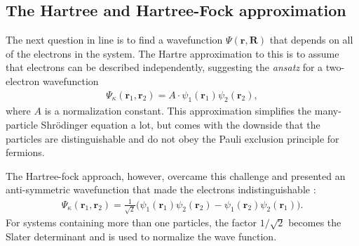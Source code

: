 \subsection{The Hartree and Hartree-Fock approximation}
\begin{comment}
As we venture along from a one-electron system to a two-electron systen, we encounter a new wavefunction and Hamiltonian that needs to describe two particles, making the two-electron Schrödinger equation read

\begin{align}
  \Big( -\frac{\hslash^2 \nabla_1^2}{2m_e} - \frac{\hslash^2\nabla_2^2}{2m_e}+ \frac{q^2}{\lvert r_1-r_2  \rvert} + V_{ext}(r) \Big) \Psi_\kappa (r_1, r_2) = E_{\kappa} \Psi_\kappa (r_1, r_2),
\end{align}
where the two first terms are the kinetic energies of the electrons, while the third term is a potential that describes the repulsive Coloumb interaction between the two electrons. The last term is the external potential, well known from the earlier scenario with only one electron.
\end{comment}
The next question in line is to find a wavefunction $\Psi(\textbf{r},\textbf{R})$ that depends on all of the electrons in the system. The Hartre \cite{Persson2020} approximation to this is to assume that electrons can be described independently, suggesting the \textit{ansatz} for a two-electron wavefunction
\begin{align}
  \Psi_\kappa(\textbf{r}_1,\textbf{r}_2) = A \cdot \psi_1(\textbf{r}_1) \psi_2(\textbf{r}_2),
\end{align}
where $A$ is a normalization constant. This approximation simplifies the many-particle Shrödinger equation a lot, but comes with the downside that the particles are distinguishable and do not obey the Pauli exclusion principle for fermions.

The Hartree-fock approach, however, overcame this challenge and presented an anti-symmetric wavefunction that made the electrons indistinguishable \cite{Griffiths2017}:
\begin{align}
  \Psi_\kappa(\textbf{r}_1,\textbf{r}_2) = \frac{1}{\sqrt{2}}\Big( \psi_1(\textbf{r}_1) \psi_2(\textbf{r}_2)  - {\psi_1(\textbf{r}_2)\psi_2(\textbf{r}_1)}\Big).
\end{align}
For systems containing more than one particles, the factor $1/\sqrt{2}$ becomes the Slater determinant and is used to normalize the wave function.


